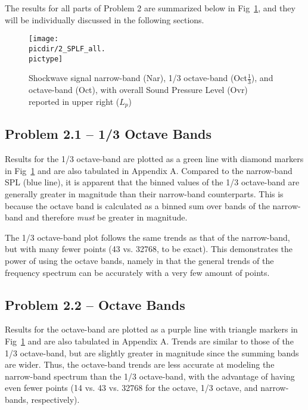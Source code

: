 \documentclass[twocolumn,10pt]{asme2ej}
\begin{document}
The results for all parts of Problem 2 are summarized below in Fig~\ref{Bands}, and they will be individually discussed in the following sections.

\begin{figure}[htb]
\begin{center}
\texttt{[image: \\picdir/2\_SPLF\_all.\\pictype]}
\caption{Shockwave signal narrow-band (Nar), 1/3 octave-band (Oct$\frac{1}{3}$), and octave-band (Oct), with overall Sound Pressure Level (Ovr) reported in upper right ($L_p$)}
\label{Bands}
\end{center}
\end{figure}


\subsection{Problem 2.1 -- 1/3 Octave Bands}

Results for the 1/3 octave-band are plotted as a green line with diamond markers in Fig~\ref{Bands} and are also tabulated in Appendix A.  Compared to the narrow-band SPL (blue line), it is apparent that the binned values of the 1/3 octave-band are generally greater in magnitude than their narrow-band counterparts.  This is because the octave band is calculated as a binned sum over bands of the narrow-band and therefore \emph{must} be greater in magnitude.

The 1/3 octave-band plot follows the same trends as that of the narrow-band, but with many fewer points (43 vs. 32768, to be exact).  This demonstrates the power of using the octave bands, namely in that the general trends of the frequency spectrum can be accurately with a very few amount of points.

\subsection{Problem 2.2 -- Octave Bands}

Results for the octave-band are plotted as a purple line with triangle markers in Fig~\ref{Bands} and are also tabulated in Appendix A. Trends are similar to those of the 1/3 octave-band, but are slightly greater in magnitude since the summing bands are wider.  Thus, the octave-band trends are less accurate at modeling the narrow-band spectrum than the 1/3 octave-band, with the advantage of having even fewer points (14 vs. 43 vs. 32768 for the octave, 1/3 octave, and narrow-bands, respectively).
\end{document}
